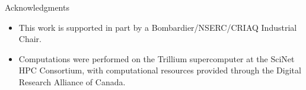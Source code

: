 \begin{frame}{\small Acknowledgments}
\scriptsize

\begin{itemize}
    \item This work is supported in part by a Bombardier/NSERC/CRIAQ Industrial Chair.

    \item Computations were performed on the Trillium supercomputer at the SciNet HPC Consortium, with computational resources provided through the Digital Research Alliance of Canada.

\end{itemize}

\end{frame}
